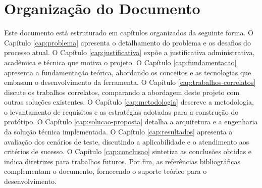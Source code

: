 \section{Organização do Documento}

Este documento está estruturado em capítulos organizados da seguinte forma. O Capítulo \ref{cap:problema} apresenta o detalhamento do problema e os desafios do processo atual. O Capítulo \ref{cap:justificativa} expõe a justificativa administrativa, acadêmica e técnica que motiva o projeto. O Capítulo \ref{cap:fundamentacao} apresenta a fundamentação teórica, abordando os conceitos e as tecnologias que embasam o desenvolvimento da ferramenta. O Capítulo \ref{cap:trabalhos-correlatos} discute os trabalhos correlatos, comparando a abordagem deste projeto com outras soluções existentes. O Capítulo \ref{cap:metodologia} descreve a metodologia, o levantamento de requisitos e as estratégias adotadas para a construção do protótipo. O Capítulo \ref{cap:solucao-proposta} detalha a arquitetura e a engenharia da solução técnica implementada. O Capítulo \ref{cap:resultados} apresenta a avaliação dos cenários de teste, discutindo a aplicabilidade e o atendimento aos critérios de sucesso. O Capítulo \ref{cap:conclusao} sintetiza as conclusões obtidas e indica diretrizes para trabalhos futuros. Por fim, as referências bibliográficas complementam o documento, fornecendo o suporte teórico para o desenvolvimento.
